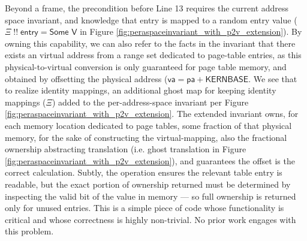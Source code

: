 Beyond a frame, the precondition before Line 13 requires the current address space invariant, and knowledge that \textsf{entry} is mapped to a random entry value ($\Xi \;!!\; \mathsf{entry} = \textsf{Some V}$ in Figure \ref{fig:peraspaceinvariant_with_p2v_extension}). By owning this capability, we can also refer to the facts in the invariant that there exists an virtual address from a range set dedicated to page-table entries, as this physical-to-virtual conversion is only guaranteed for page table memory, and obtained by offsetting the physical address ($\textsf{va} = \textsf{pa} + \textsf{KERNBASE}$. 
We see that to realize identity mappings, an additional ghost map for keeping identity mappings ($\Xi$) added to the per-address-space
invariant per Figure \ref{fig:peraspaceinvariant_with_p2v_extension}. The extended invariant owns, for each memory location dedicated to page tables, some fraction of
that physical memory, for the sake of constructing the virtual-mapping, also the fractional ownership abstracting translation (i.e. ghost translation in Figure \ref{fig:peraspaceinvariant_with_p2v_extension}), and guarantees the offset is the correct calculation.
Subtly, the operation ensures the relevant table entry is readable, but the exact portion of ownership returned must be determined by inspecting the valid bit
of the value in memory --- so full ownership is returned only for unused entries.
This is a simple piece of code whose functionality is critical and whose correctness is highly non-trivial. No prior work engages with this problem.

